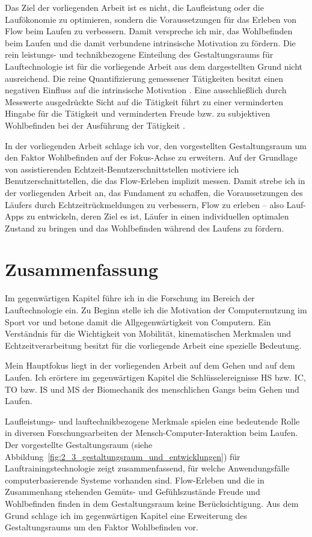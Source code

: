 Das Ziel der vorliegenden Arbeit ist es nicht, die Laufleistung oder die Laufökonomie zu optimieren, sondern die Voraussetzungen für das Erleben von Flow beim Laufen zu verbessern. Damit verspreche ich mir, das Wohlbefinden beim Laufen und die damit verbundene intrinsische Motivation zu fördern. Die rein leistungs- und technikbezogene Einteilung des Gestaltungsraums für Lauftechnologie ist für die vorliegende Arbeit aus dem dargestellten Grund nicht ausreichend. Die reine Quantifizierung gemessener Tätigkeiten besitzt einen negativen Einfluss auf die intrinsische Motivation \citep[vgl.][]{Etkin2016}. Eine ausschließlich durch Messwerte ausgedrückte Sicht auf die Tätigkeit führt zu einer verminderten Hingabe für die Tätigkeit und verminderten Freude bzw. zu subjektiven Wohlbefinden bei der Ausführung der Tätigkeit \citep[vgl.][]{Etkin2016}.

In der vorliegenden Arbeit schlage ich vor, den vorgestellten Gestaltungsraum um den Faktor Wohlbefinden auf der Fokus-Achse zu erweitern. Auf der Grundlage von assistierenden Echtzeit-Benutzerschnittstellen motiviere ich Benutzerschnittstellen, die das Flow-Erleben implizit messen. Damit strebe ich in der vorliegenden Arbeit an, das Fundament zu schaffen, die Voraussetzungen des Läufers durch Echtzeitrückmeldungen zu verbessern, Flow zu erleben -- also Lauf-Apps zu entwickeln, deren Ziel es ist, Läufer in einen individuellen optimalen Zustand zu bringen und das Wohlbefinden während des Laufens zu fördern.

\section{Zusammenfassung}
\label{sec:zusammenfassung_2}
Im gegenwärtigen Kapitel führe ich in die Forschung im Bereich der Lauftechnologie ein. Zu Beginn stelle ich die Motivation der Computernutzung im Sport vor und betone damit die Allgegenwärtigkeit von Computern. Ein Verständnis für die Wichtigkeit von Mobilität, kinematischen Merkmalen und Echtzeitverarbeitung besitzt für die vorliegende Arbeit eine spezielle Bedeutung.

Mein Hauptfokus liegt in der vorliegenden Arbeit auf dem Gehen und auf dem Laufen. Ich erörtere im gegenwärtigen Kapitel die Schlüsselereignisse \ac{HS} bzw. \ac{IC}, \ac{TO} bzw. \ac{IS} und \ac{MS} der Biomechanik des menschlichen Gangs beim Gehen und Laufen.

Laufleistungs- und lauftechnikbezogene Merkmale spielen eine bedeutende Rolle in diversen Forschungsarbeiten der Mensch-Computer-Interaktion beim Laufen. Der vorgestellte Gestaltungsraum (siehe Abbildung~\ref{fig:2_3_gestaltungsraum_und_entwicklungen}) für Lauftrainingstechnologie zeigt zusammenfassend, für welche Anwendungsfälle computerbasierende Systeme vorhanden sind. Flow-Erleben und die in Zusammenhang stehenden Gemüts- und Gefühlszustände Freude und Wohlbefinden finden in dem Gestaltungsraum keine Berücksichtigung. Aus dem Grund schlage ich im gegenwärtigen Kapitel eine Erweiterung des Gestaltungsraums um den Faktor Wohlbefinden vor.

